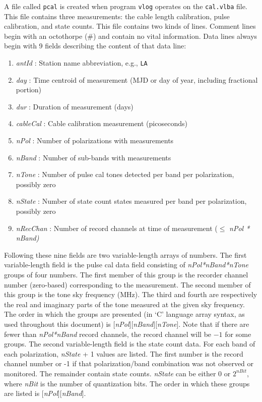 A file called {\tt pcal} is created when program {\tt vlog} operates on the {\tt cal.vlba} file.
This file contains three measurements: the cable length calibration, pulse calibration, and state counts.
This file contains two kinds of lines.
Comment lines begin with an octothorpe (\#) and contain no vital information.
Data lines always begin with 9 fields describing the content of that data line:
\begin{enumerate}
\item {\em antId} : Station name abbreviation, e.g., {\tt LA}
\item {\em day} : Time centroid of measurement (MJD or day of year, including fractional portion)
\item {\em dur} : Duration of measurement (days)
\item {\em cableCal} : Cable calibration measurement (picoseconds)
\item {\em nPol} : Number of polarizations with measurements 
\item {\em nBand} : Number of sub-bands with measurements 
\item {\em nTone} : Number of pulse cal tones detected per band per polarization, possibly zero 
\item {\em nState} : Number of state count states measured per band per polarization, possibly zero
\item {\em nRecChan} : Number of record channels at time of measurement ($\le$ \em{nPol * nBand})
\end{enumerate}
Following these nine fields are two variable-length arrays of numbers.
The first variable-length field is the pulse cal data field consisting of {\em nPol*nBand*nTone} groups of four numbers.
The first member of this group is the recorder channel number (zero-based) corresponding to the measurement.
The second member of this group is the tone sky frequency (MHz).
The third and fourth are respectively the real and imaginary parts of the tone measured at the given sky frequency.
The order in which the groups are presented (in `C' language array syntax, as used throughout this document) is $[${\em nPol}$][${\em nBand}$][${\em nTone}$]$.
Note that if there are fewer than {\em nPol*nBand} record channels, the record channel will be $-1$ for some groups.
The second variable-length field is the state count data.
For each band of each polarization, {\em nState} + 1 values are listed.
The first number is the record channel number or -1 if that polarization/band combination was not observed or monitored.
The remainder contain state counts.
{\em nState} can be either 0 or $2^{\mathit nBit}$, where {\em nBit} is the number of quantization bits.
The order in which these groups are listed is $[${\em nPol}$][${\em nBand}$]$.







